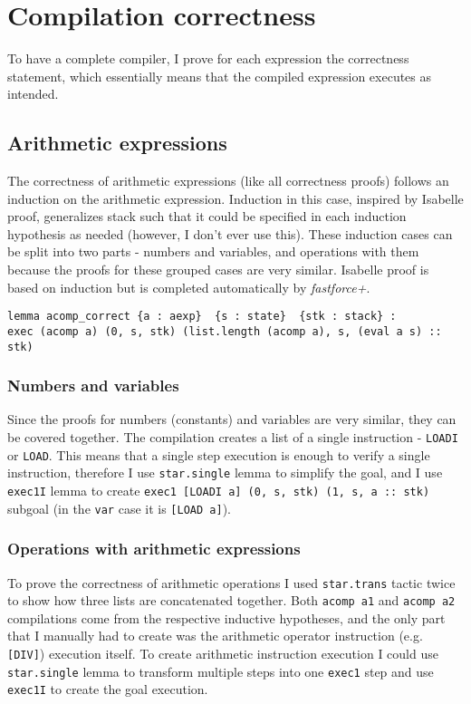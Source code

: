 \chapter{Compilation correctness}\label{s:correctness}
To have a complete compiler, I prove for each expression the correctness statement, which essentially means that the compiled expression executes as intended. 


\section{Arithmetic expressions}
The correctness of arithmetic expressions (like all correctness proofs) follows an induction on the arithmetic expression. Induction in this case, inspired by Isabelle proof, generalizes stack such that it could be specified in each induction hypothesis as needed (however, I don't ever use this). These induction cases can be split into two parts - numbers and variables, and operations with them because the proofs for these grouped cases are very similar. Isabelle proof is based on induction but is completed automatically by \emph{fastforce+}.

\begin{lstlisting}
lemma acomp_correct {a : aexp}  {s : state}  {stk : stack} :
exec (acomp a) (0, s, stk) (list.length (acomp a), s, (eval a s) :: stk)
\end{lstlisting}

\subsection{Numbers and variables}

Since the proofs for numbers (constants) and variables are very similar, they can be covered together. The compilation creates a list of a single instruction - \lstinline{LOADI} or \lstinline{LOAD}. This means that a single step execution is enough to verify a single instruction, therefore I use \lstinline{star.single} lemma to simplify the goal, and I use \lstinline{exec1I} lemma to create \lstinline{exec1 [LOADI a] (0, s, stk) (1, s, a :: stk)} subgoal (in the \lstinline{var} case it is \lstinline{[LOAD a]}).

\subsection{Operations with arithmetic expressions}

To prove the correctness of arithmetic operations I used \lstinline{star.trans} tactic twice to show how three lists are concatenated together. Both \lstinline{acomp a1} and \lstinline{acomp a2} compilations come from the respective inductive hypotheses, and the only part that I manually had to create was the arithmetic operator instruction (e.g. \lstinline{[DIV]}) execution itself. To create arithmetic instruction execution I could use \lstinline{star.single} lemma to transform multiple steps into one \lstinline{exec1} step and use \lstinline{exec1I} to create the goal execution.

